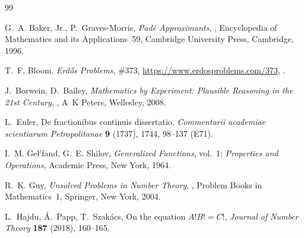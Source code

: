 \begin{thebibliography}{99}

G.~A. Baker, Jr., P.~Graves-Morris, \emph{Pad\'e Approximants},
, Encyclopedia of Mathematics and its Applications~59,
Cambridge University Press, Cambridge, 1996.

T.~F. Bloom, \emph{Erd\H{o}s Problems}, \#373,
\url{https://www.erdosproblems.com/373}, \consultato.

J.~Borwein, D.~Bailey, \emph{Mathematics by Experiment: Plausible
Reasoning in the 21st Century}, , A~K Peters, Wellesley,
2008.

L.~Euler, De fractionibus continuis dissertatio,
\emph{Commentarii academiae scientiarum Petropolitanae} \textbf{9} (1737),
1744, 98--137 (E71).

I.~M. Gel'fand, G.~E. Shilov, \emph{Generalized Functions}, vol.~1:
\emph{Properties and Operations}, Academic Press, New York, 1964.

R.~K. Guy, \emph{Unsolved Problems in Number Theory}, ,
Problem Books in Mathematics~1, Springer, New York, 2004.

L.~Hajdu, \'A.~Papp, T.~Szak\'acs, On the equation $A!B!=C!$,
\emph{Journal of Number Theory} \textbf{187} (2018), 160--165.


\end{thebibliography}
